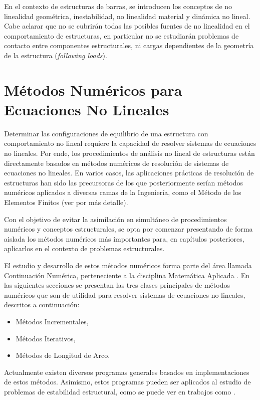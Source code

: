 En el contexto de estructuras de barras, se introducen los conceptos de no linealidad geométrica, inestabilidad, no linealidad material y dinámica no lineal. %
%
Cabe aclarar que no se cubrirán todas las posibles fuentes de no linealidad en el comportamiento de estructuras, en particular no se estudiarán problemas de contacto entre componentes estructurales, ni cargas dependientes de la geometría de la estructura (\textit{following loads}).

\section{Métodos Numéricos para Ecuaciones No Lineales} \label{sec:mnecnl}

Determinar las configuraciones de equilibrio de una estructura con comportamiento no lineal requiere la capacidad de resolver sistemas de ecuaciones no lineales. Por ende, los procedimientos de análisis no lineal de estructuras están directamente basados en métodos numéricos de resolución de sistemas de ecuaciones no lineales. %
%
En varios casos, las aplicaciones prácticas de resolución de estructuras han sido las precursoras de los que posteriormente serían métodos numéricos aplicados a diversas ramas de la Ingeniería, como el Método de los Elementos Finitos \citep{Zienkiewicz1972} (ver  \citep{crisfield1996non,Bathe2014} por más detalle).

Con el objetivo de evitar la asimilación en simultáneo de procedimientos numéricos y conceptos estructurales, se opta por comenzar presentando de forma aislada los métodos numéricos más importantes para, en capítulos posteriores, aplicarlos en el contexto de problemas estructurales. 

El estudio y desarrollo de estos métodos numéricos forma parte del área llamada Continuación Numérica, perteneciente a la disciplina Matemática Aplicada \citep{Doedl2014Slides}. %
%
En las siguientes secciones se presentan las tres clases principales de métodos numéricos que son de utilidad para resolver sistemas de ecuaciones no lineales, descritos a continuación: %
%
%
\begin{itemize}
	\item Métodos Incrementales,
	\item Métodos Iterativos,
	\item Métodos de Longitud de Arco.
\end{itemize}

Actualmente existen diversos programas generales basados en implementaciones de estos métodos. %
%
Asimismo, estos programas pueden ser aplicados al estudio de problemas de estabilidad estructural, como se puede ver en trabajos como \citep{Wadee245}.


